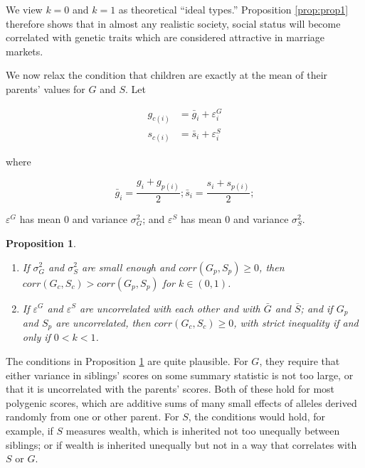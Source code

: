 \documentclass[
]{article}
\newtheorem{prop}{Proposition}
\begin{document}
We view \(k = 0\) and \(k = 1\) as theoretical ``ideal types.'' Proposition
\ref{prop:prop1} therefore shows that in almost any realistic society,
social status will become correlated with genetic traits which are
considered attractive in marriage markets.

We now relax the condition that children are exactly at the mean of
their parents' values for \(G\) and \(S\). Let

\begin{align*}
g_{c(i)} & = \bar{g}_{i}+\varepsilon_{i}^{G} \\
s_{c(i)} & = \bar{s}_{i}+\varepsilon_{i}^{S}
\end{align*}

where

\[
\bar{g}_{i} = \frac{g_{i} + g_{p(i)}}{2}; \bar{s}_{i} = \frac{s_{i} + s_{p(i)}}{2};
\]

\(\varepsilon^{G}\) has mean 0 and variance \(\sigma_{G}^{2}\); and
\(\varepsilon^{S}\) has mean 0 and variance \(\sigma_{S}^{2}\).

\begin{prop}
\label{prop:robustness}

\begin{enumerate}

\item If $\sigma_{G}^{2}$ and $\sigma_{S}^{2}$ are small enough and $corr(G_{p},S_{p}) \ge 0$,
then $corr(G_{c},S_{c}) > corr(G_{p},S_{p})$ for $k \in (0,1)$.

\item If $\varepsilon^{G}$ and $\varepsilon^{S}$ are uncorrelated with
each other and with $\bar{G}$ and $\bar{S}$; and if $G_{p}$ and
$S_{p}$ are uncorrelated, then $corr(G_{c},S_{c}) \ge 0$, with strict
inequality if and only if $0<k<1$.

\end{enumerate}

\end{prop}

The conditions in Proposition \ref{prop:robustness} are quite plausible.
For \(G\), they require that either variance in siblings' scores on some
summary statistic is not too large, or that it is uncorrelated with the
parents' scores. Both of these hold for most polygenic scores, which are
additive sums of many small effects of alleles derived randomly from one
or other parent. For \(S\), the conditions would hold, for example, if \(S\)
measures wealth, which is inherited not too unequally between siblings;
or if wealth is inherited unequally but not in a way that correlates
with \(S\) or \(G\).
\end{document}
